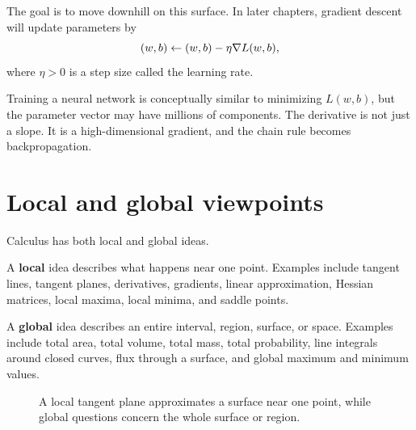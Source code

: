 The goal is to move downhill on this surface. In later chapters, gradient descent will update parameters by
\[
  (w,b)\leftarrow (w,b)-\eta\nabla L(w,b),
\]
where $\eta>0$ is a step size called the learning rate.

\begin{bridgebox}[title={AI connection}]
Training a neural network is conceptually similar to minimizing $L(w,b)$, but the parameter vector may have millions of components. The derivative is not just a slope. It is a high-dimensional gradient, and the chain rule becomes backpropagation.
\end{bridgebox}

\section{Local and global viewpoints}

Calculus has both local and global ideas.

A \textbf{local} idea describes what happens near one point. Examples include tangent lines, tangent planes, derivatives, gradients, linear approximation, Hessian matrices, local maxima, local minima, and saddle points.

A \textbf{global} idea describes an entire interval, region, surface, or space. Examples include total area, total volume, total mass, total probability, line integrals around closed curves, flux through a surface, and global maximum and minimum values.

\begin{figure}[H]
\centering
{}
\caption{A local tangent plane approximates a surface near one point, while global questions concern the whole surface or region.}
\label{fig:local-tangent-plane-global-surface}
\end{figure}

